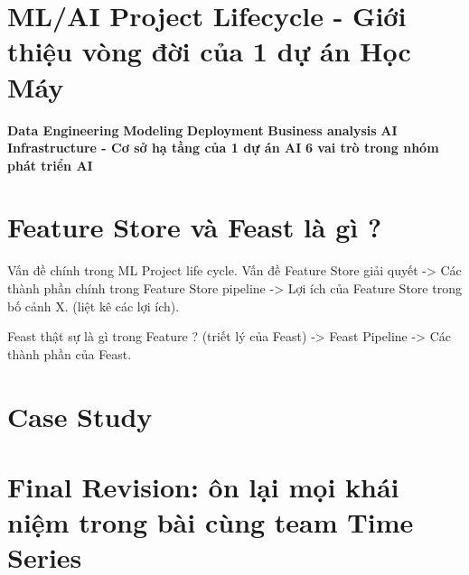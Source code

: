\documentclass[11pt]{article}
\begin{document}
\section{ML/AI Project Lifecycle - Giới thiệu vòng đời của 1 dự án Học Máy}
\textbf{Data Engineering}
\textbf{Modeling}
\textbf{Deployment}
\textbf{Business analysis}
\textbf{AI Infrastructure - Cơ sở hạ tầng của 1 dự án AI}
\textbf{6 vai trò trong nhóm phát triển AI}

\section{Feature Store và Feast là gì ?}
Vấn đề chính trong ML Project life cycle.
Vấn đề Feature Store giải quyết
-> Các thành phần chính trong Feature Store pipeline
-> Lợi ích của Feature Store trong bố cảnh X. (liệt kê các lợi ích).

Feast thật sự là gì trong Feature ? (triết lý của Feast)
-> Feast Pipeline -> Các thành phần của Feast.

\section{Case Study}



\section{Final Revision: ôn lại mọi khái niệm trong bài cùng team Time Series}


\end{document}
